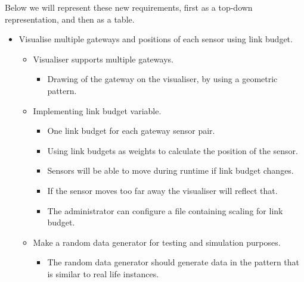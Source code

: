 \documentclass[../document]{subfiles}
\begin{document}
Below we will represent these new requirements, first as a top-down representation, and then as a table.

\begin{itemize}
	\item
	Visualise multiple gateways and positions of each sensor using link budget.
	\begin{itemize}
		\item
		Visualiser supports multiple gateways.
		\begin{itemize}
			\item
			Drawing of the gateway on the visualiser, by using a geometric pattern.
		\end{itemize}
		\item
		Implementing link budget variable.
		\begin{itemize}
			\item
			One link budget for each gateway sensor pair.
			\item
			Using link budgets as weights to calculate the position of the sensor.
			\item
			Sensors will be able to move during runtime if link budget changes.
			\item
			If the sensor moves too far away the visualiser will reflect that.
			\item
			The administrator can configure a file containing scaling for link budget.
		\end{itemize}
		\item
		Make a random data generator for testing and simulation purposes.
		\begin{itemize}
			\item
			The random data generator should generate data in the pattern that is similar to real life instances.
		\end{itemize}
	\end{itemize}
\end{itemize}
	
\end{document}
